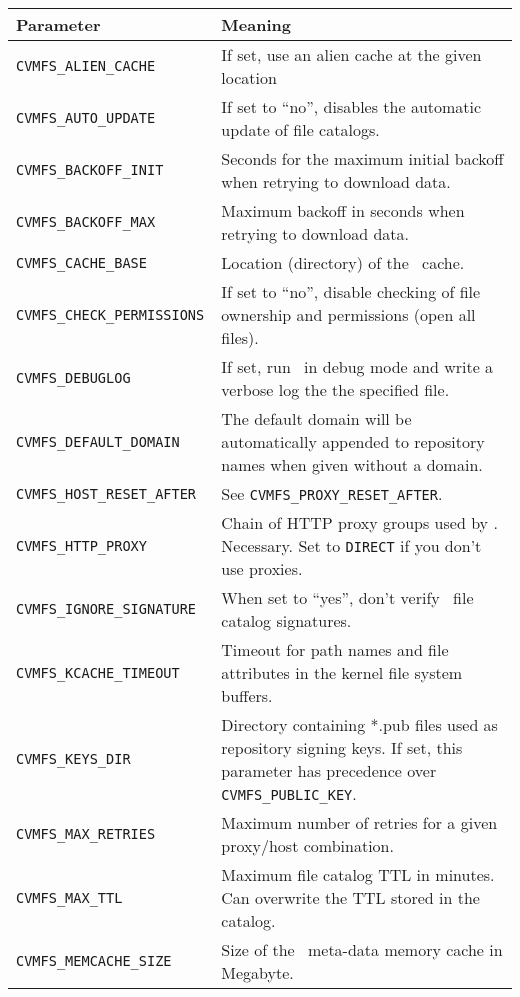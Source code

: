	\begin{longtable}{lX}
		\toprule
		{\bf\centering Parameter} 			& {\bf\centering Meaning}\\
		\midrule
		\tt CVMFS\_ALIEN\_CACHE			& If set, use an alien cache at the given location\\
		\tt CVMFS\_AUTO\_UPDATE			& If set to ``no'', disables the automatic update of file catalogs.\\
		\tt CVMFS\_BACKOFF\_INIT			& Seconds for the maximum initial backoff when retrying to download data.\\ 
		\tt CVMFS\_BACKOFF\_MAX			& Maximum backoff in seconds when retrying to download data.\\
		\tt CVMFS\_CACHE\_BASE				& Location (directory) of the \cvmfs\ cache.\\
		\tt CVMFS\_CHECK\_PERMISSIONS		& If set to ``no'', disable checking of file ownership and permissions (open all files).\\
		\tt CVMFS\_DEBUGLOG				& If set, run \cvmfs\ in debug mode and write a verbose log the the specified file.\\
		\tt CVMFS\_DEFAULT\_DOMAIN			& The default domain will be automatically appended to repository names when given without a domain.\\
		\tt CVMFS\_HOST\_RESET\_AFTER		& See \texttt{CVMFS\_PROXY\_RESET\_AFTER}.\\
		\tt CVMFS\_HTTP\_PROXY				& Chain of HTTP proxy groups used by \cvmfs. Necessary. Set to \texttt{DIRECT} if you don't use proxies.\\
		\tt CVMFS\_IGNORE\_SIGNATURE		& When set to ``yes'', don't verify \cvmfs\ file catalog signatures.\\
		\tt CVMFS\_KCACHE\_TIMEOUT			& Timeout for path names and file attributes in the kernel file system buffers.\\
		\tt CVMFS\_KEYS\_DIR				& Directory containing *.pub files used as repository signing keys.  If set, this parameter has precedence over \texttt{CVMFS\_PUBLIC\_KEY}.\\
		\tt CVMFS\_MAX\_RETRIES			& Maximum number of retries for a given proxy/host combination.\\
		\tt CVMFS\_MAX\_TTL				& Maximum file catalog TTL in minutes.  Can overwrite the TTL stored in the catalog.\\
		\tt CVMFS\_MEMCACHE\_SIZE			& Size of the \cvmfs\ meta-data memory cache in Megabyte.\\

\end{longtable}
